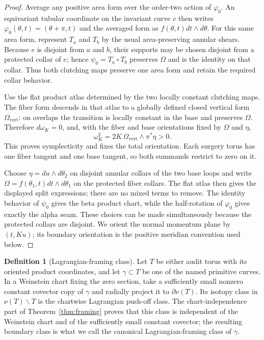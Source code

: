 \documentclass[11pt]{article}
\theoremstyle{definition}
\newtheorem{definition}[theorem]{Definition}
\begin{document}
\begin{proof}
Average any positive area form over the order-two action of $\varphi_0$.
An equivariant tubular coordinate on the invariant curve $c$ then writes
$\varphi_0(\theta,t)=(\theta+\pi,t)$ and the averaged form as
$f(\theta,t)dt\wedge d\theta$.  For this same area form, represent $T_a$
and $T_b$ by the usual area-preserving annular shears.  Because $e$ is
disjoint from $a$ and $b$, their supports may be chosen disjoint from a
protected collar of $e$; hence $\psi_0=T_a\circ T_b$ preserves $\Omega$ and
is the identity on that collar.  Thus both clutching maps preserve one area
form and retain the required collar behavior.

Use the flat product atlas determined by the two locally constant clutching
maps.  The fiber form descends in that atlas to a globally defined closed
vertical form $\Omega_{\mathrm{vert}}$: on overlaps the transition is
locally constant in the base and preserves $\Omega$.  Therefore
$d\omega_K=0$, and, with the fiber and base orientations fixed by
$\Omega$ and $\eta$,
\[
       \omega_K^2=2K\,\Omega_{\mathrm{vert}}\wedge\pi^*\eta>0.
\]
This proves symplecticity and fixes the total orientation.  Each surgery
torus has one fiber tangent and one base tangent, so both summands restrict
to zero on it.

Choose $\eta=du\wedge d\theta_2$ on disjoint annular collars of the two base
loops and write $\Omega=f(\theta_1,t)dt\wedge d\theta_1$ on the protected
fiber collars.  The flat atlas then gives the displayed split expressions;
there are no mixed terms to remove.  The identity behavior of $\psi_0$ gives
the beta product chart, while the half-rotation of $\varphi_0$ gives exactly
the alpha seam.  These choices can be made simultaneously because the
protected collars are disjoint.  We orient the normal momentum plane by
$(t,Ku)$; its boundary orientation is the positive meridian convention used
below.
\end{proof}

\begin{definition}[Lagrangian-framing class]
\label{def:lagrangian-framing}
Let $T$ be either audit torus with its oriented product coordinates, and let
$\gamma\subset T$ be one of the named primitive curves.  In a Weinstein
chart fixing the zero section, take a sufficiently small nonzero constant
covector copy of $\gamma$ and radially project it to
$\partial\nu(T)$.  Its isotopy class in
$\nu(T)\smallsetminus T$ is the chartwise Lagrangian push-off class.  The
chart-independence part of Theorem~\ref{thm:framing} proves that this class is
independent of the Weinstein chart and of the sufficiently small constant
covector; the resulting boundary class is what we call the canonical
Lagrangian-framing class of $\gamma$.
\end{definition}
\end{document}
